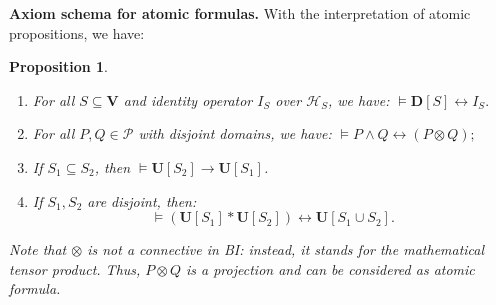 \documentclass[conference,compsoc, 10pt]{IEEEtran}
\newtheorem{proposition}{Proposition}[section]
\newcommand {\cP } {{\mathcal{P}}}
\newcommand {\cH } {{\mathcal{H}}}
\newcommand {\id } {{I}}
\newcommand {\bD} {{\mathbf{D}}}
\newcommand {\free }[1] {{\mathsf{free}\left(#1\right)}}
\newcommand {\vars } {\mathbf{V}}
\newcommand {\varb } {\mathsf{var}_{\mathbf{B}}}
\newcommand {\uni } {{\mathbf{U}}}
\newcommand {\unia } {{\mathbf{U}}}
\newcommand {\inu } {{\mathbf{Inu}}}
\newcommand {\ip } {{\mathbf{IP}}}
\newcommand{\sd}{\diamond}%
\newcommand{\qvee}{\sqcup}
\newcommand{\qwedge}{\sqcap}
\DeclareRobustCommand{\gimplr}{%
	\mathbin{\ooalign{$\leftrightarrow$\cr\hss\raisebox{1ex}{\scalebox{.5}{G}}\hss}}}
\begin{document}
	{\vskip 3pt}
	
	\noindent\textbf{Axiom schema for atomic formulas.} With the interpretation of atomic propositions, we have: 
	\begin{proposition}
		\label{prop axiom projection}
    \strut{}
		\begin{enumerate}
			\item For all $S\subseteq \vars$ and identity operator $I_S$ over $\cH_S$, we have:  $\models \bD[S]\leftrightarrow \id_{S}.$ %
			\item For all $P,Q\in\cP$ with disjoint domains, we have:
        $\models  P\wedge Q \leftrightarrow (P\otimes Q) ;$  	%
			\item If $S_1\subseteq S_2$, then $\models\unia[S_2]\rightarrow\unia[S_1]$.
			\item If $S_1, S_2$ are disjoint, then:
        $$ \models(\unia[S_1]\ast\unia[S_2])\leftrightarrow\unia[S_1\cup S_2] .$$
		\end{enumerate}
    Note that $\otimes$ is \emph{not} a connective in BI: instead, it stands
    for the mathematical tensor product. Thus, $P\otimes Q$ is a
    projection and can be considered as atomic formula.
	\end{proposition}
	
\end{document}
